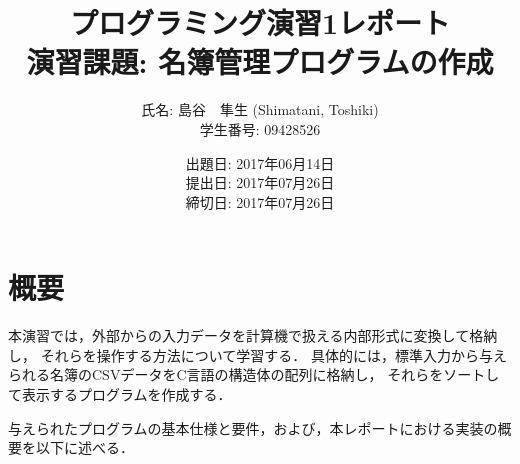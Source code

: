 \documentclass[a4paper,11pt]{jarticle}
\title{プログラミング演習1レポート \\
       演習課題: 名簿管理プログラムの作成}
\author{氏名: 島谷　隼生 (Shimatani, Toshiki) \\
        学生番号: 09428526}
\date{出題日: 2017年06月14日 \\
      提出日: 2017年07月26日 \\
      締切日: 2017年07月26日 \\}  %
\begin{document}
\maketitle


\section{概要}

本演習では，外部からの入力データを計算機で扱える内部形式に変換して格納し，
それらを操作する方法について学習する．
具体的には，標準入力から与えられる名簿のCSVデータをC言語の構造体の配列に格納し，
それらをソートして表示するプログラムを作成する．

与えられたプログラムの基本仕様と要件，および，本レポートにおける実装の概要を以下に述べる．
\end{document}
